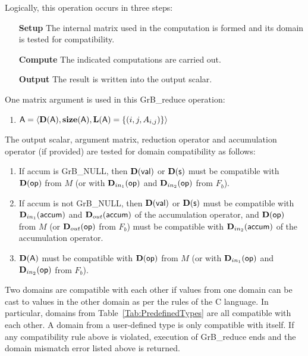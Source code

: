 Logically, this operation occurs in three steps:
\begin{enumerate}[leftmargin=0.85in]
\item[\bf Setup] The internal matrix used in the computation is formed 
and its domain is tested for compatibility.
\item[\bf Compute] The indicated computations are carried out.
\item[\bf Output] The result is written into the output scalar.
\end{enumerate}

One matrix argument is used in this {\sf GrB\_reduce} operation:
\begin{enumerate}
	\item ${\sf A} = \langle \bold{D}({\sf A}),\bold{size}({\sf A}),
    \bold{L}({\sf A}) = \{(i,j,A_{i,j}) \} \rangle$
\end{enumerate}

The output scalar, argument matrix, reduction operator and accumulation 
operator (if provided) are tested for domain compatibility as follows:
\begin{enumerate}

	\item If {\sf accum} is {\sf GrB\_NULL}, then $\bold{D}({\sf val})$ or $\bold{D}({\sf s})$ must be
    compatible with $\bold{D}({\sf op})$ from $M$  (or with $\mbox{$\mathbf{D}_{in_{1}}$}({\sf op})$ and 
    $\mbox{$\mathbf{D}_{in_{2}}$}({\sf op})$ from $F_b$).

	\item If {\sf accum} is not {\sf GrB\_NULL}, then $\bold{D}({\sf val})$ or $\bold{D}({\sf s})$ must be
    compatible with $\mbox{$\mathbf{D}_{in_{1}}$}({\sf accum})$ and $\mbox{$\mathbf{D}_{out}$}({\sf accum})$ of the accumulation operator, and 
    $\bold{D}({\sf op})$ from $M$  (or $\mbox{$\mathbf{D}_{out}$}({\sf op})$ from $F_b$) must be compatible 
    with $\mbox{$\mathbf{D}_{in_{2}}$}({\sf accum})$ of the accumulation operator.

	\item $\bold{D}({\sf A})$ must be compatible with $\bold{D}({\sf op})$ from $M$ 
    (or with $\mbox{$\mathbf{D}_{in_{1}}$}({\sf op})$ and $\mbox{$\mathbf{D}_{in_{2}}$}({\sf op})$ from $F_b$).
\end{enumerate}
Two domains are compatible with each other if values from one domain can be cast 
to values in the other domain as per the rules of the C language.
In particular, domains from Table~\ref{Tab:PredefinedTypes} are all compatible 
with each other. A domain from a user-defined type is only compatible with itself.
If any compatibility rule above is violated, execution of {\sf GrB\_reduce} ends and 
the domain mismatch error listed above is returned.

